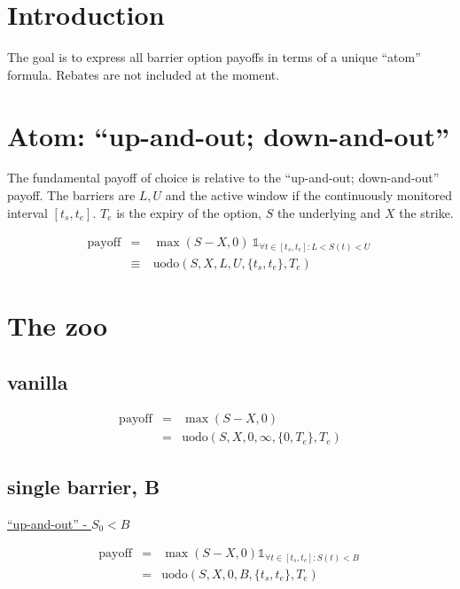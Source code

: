 \documentclass[12pt,twoside]{article}
\begin{document}
\section{Introduction}

The goal is to express all barrier option payoffs in terms of a unique ``atom'' formula. Rebates are not included at the moment.

\section{Atom: ``up-and-out; down-and-out''}

The fundamental payoff of choice is relative to the ``up-and-out; down-and-out'' payoff. The barriers are $L, U$ and the active window if the continuously monitored interval $[t_s, t_e]$. $T_e$ is the expiry of the option, $S$ the underlying and $X$ the strike. 

\begin{eqnarray}
 \text{payoff} & = & \max(S-X, 0)\ \mathbb{1}_{\forall t \in [t_s, t_e]: L < S(t) < U}\ \nonumber \\
               & \equiv\ & \text{uodo}(S, X, L, U, \{t_{s}, t_e\}, T_{e})
\end{eqnarray}

\section{The zoo}


\subsection{vanilla}

\begin{eqnarray}
 \text{payoff} & = & \max(S-X, 0) \nonumber \\
               & = & \text{uodo}(S, X, 0, \infty, \{0, T_{e}\}, T_{e})
\end{eqnarray}


\subsection{single barrier, B}

\noindent \underline{``up-and-out'' - $S_0 < B$}

\begin{eqnarray}
 \text{payoff} & = & \max(S - X, 0) \mathbb{1}_{\forall t \in [t_s, t_e]: S(t) < B}\ \nonumber \\
               & = & \text{uodo}(S, X, 0, B, \{t_{s}, t_e\}, T_{e})
\end{eqnarray}
\end{document}
